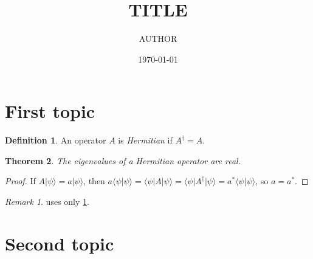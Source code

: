 \documentclass[11pt]{article}
\title{{{TITLE}}}
\author{{{AUTHOR}}}
\date{\today}
\theoremstyle{plain}
\newtheorem{theorem}{Theorem}[section]
\theoremstyle{definition}
\newtheorem{definition}[theorem]{Definition}
\theoremstyle{remark}
\newtheorem*{remark}{Remark}
\numberwithin{equation}{section}
\begin{document}
\maketitle
\tableofcontents

\section{First topic}

\begin{definition}\label{def:hermitian}
An operator $A$ is \emph{Hermitian} if $A^\dagger = A$.
\end{definition}

\begin{theorem}\label{thm:real}
The eigenvalues of a Hermitian operator are real.
\end{theorem}
\begin{proof}
If $A\lvert\psi\rangle = a\lvert\psi\rangle$, then $a\langle\psi\vert\psi\rangle = \langle\psi\vert A\vert\psi\rangle
= \langle\psi\vert A^\dagger\vert\psi\rangle = a^*\langle\psi\vert\psi\rangle$, so $a = a^*$.
\end{proof}

\begin{remark}
 uses only \cref{def:hermitian}.
\end{remark}

\section{Second topic}
\end{document}
